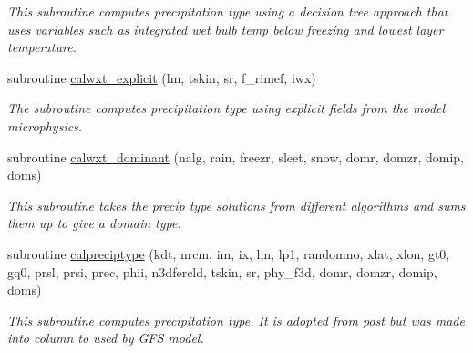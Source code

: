 \begin{DoxyCompactItemize}
\begin{DoxyCompactList}\small\item\em This subroutine computes precipitation type using a decision tree approach that uses variables such as integrated wet bulb temp below freezing and lowest layer temperature. \end{DoxyCompactList}\item 
subroutine \hyperlink{calpreciptype_8f_a84b16fee5df628928b15bfbde86ee0ca}{calwxt\+\_\+explicit} (lm, tskin, sr, f\+\_\+rimef, iwx)
\begin{DoxyCompactList}\small\item\em The subroutine computes precipitation type using explicit fields from the model microphysics. \end{DoxyCompactList}\item 
subroutine \hyperlink{calpreciptype_8f_aa8cf475c2ada385565809d05de8fb215}{calwxt\+\_\+dominant} (nalg, rain, freezr, sleet, snow,                                                                                                           domr, domzr, domip, doms)
\begin{DoxyCompactList}\small\item\em This subroutine takes the precip type solutions from different algorithms and sums them up to give a domain type. \end{DoxyCompactList}\end{DoxyCompactItemize}
{\bf }\par
\begin{DoxyCompactItemize}
\item 
subroutine \hyperlink{calpreciptype_8f_a8a471b8f23f55928b69814c887ec925a}{calpreciptype} (kdt, nrcm, im, ix, lm, lp1, randomno,                                                                                                                                           xlat, xlon,                                                                                                                                                                                                                               gt0, gq0, prsl, prsi, prec,                                                                                                                                                                           phii, n3dfercld, tskin, sr, phy\+\_\+f3d,                                                                                                                                       domr, domzr, domip, doms)
\begin{DoxyCompactList}\small\item\em This subroutine computes precipitation type. It is adopted from post but was made into column to used by G\+FS model. \end{DoxyCompactList}\end{DoxyCompactItemize}



